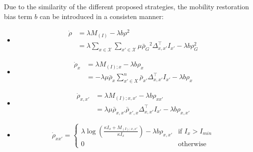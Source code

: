 Due to the similarity of the different proposed strategies, the mobility restoration bias term $b$ can be introduced in a consisten manner:
\begin{itemize}
    \item {}
         
    \begin{equation}
        \begin{aligned}
    \dot{\rho} &= \lambda M_{(I)} - \lambda b \rho^2 \\
               &= \lambda \sum_{x \in \mathcal{X}} \sum_{x' \in \mathcal{X}} \mu {\bar{\rho}_{G}}^2 \Delta^{\top}_{x,x'} I_{x'} - \lambda b \rho_G^2 \label{global bias}
        \end{aligned}
    \end{equation}

    \item {}     
    \begin{equation}
        \begin{aligned}
            \dot{\rho}_x &= \lambda M_{(I);x} - \lambda b \rho_{x} \\
            &= -\lambda \mu \bar{\rho}_x \sum_{x' \in X}^{n} \bar{\rho}_{x'} \Delta^{\top}_{x,x'} I_{x'}  - \lambda b \rho_x
        \end{aligned}
    \end{equation}

    \item {} 
    \begin{equation}
        \begin{aligned}
            \dot{\rho}_{x,x'} &= \lambda M_{(I);x,x'} - \lambda b \rho_{xx'}\\
            &= \lambda \mu \bar{\rho}_{x,x'} \bar{\rho}_{x',x} \Delta^{\top}_{x,x'} I_{x'} - \lambda b \rho_{x,x'}
        \end{aligned}
    \end{equation}

    \item {} 
    \begin{equation}
        \dot{\rho}_{xx'} = 
        \begin{cases} 
        \lambda \log\left(\frac{\kappa I_{x} + M_{(I);x,x'}}{\kappa I_{x}}\right) - \lambda b \rho_{x,x'} & \text{if } I_{x} > I_{min} \\ 
        0 & \text{otherwise}
        \end{cases}
    \end{equation}
\end{itemize}

